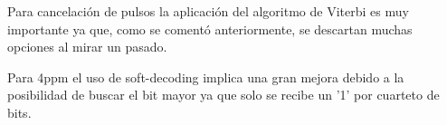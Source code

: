 Para cancelación de pulsos la aplicación del algoritmo de Viterbi es muy importante ya que, como se comentó anteriormente,
se descartan muchas opciones al mirar un pasado.

Para 4ppm el uso de soft-decoding implica una gran mejora debido a la posibilidad de buscar el bit mayor ya que solo 
se recibe un '1' por cuarteto de bits.




\chapterend{}

